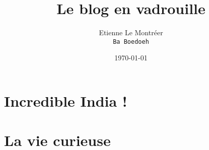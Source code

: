\documentclass[a5paper, 10pt]{book}
\begin{document}
\frontmatter
\title{Le blog en vadrouille}
\author{Etienne Le Montr\'eer\\
\texttt{Ba Boedoeh}}
\date{\today}

\maketitle

\begin{spacing}{1}
\tableofcontents

\mainmatter

%

\chapter{Incredible India !}

\pagebreak
\pagebreak
\pagebreak
\pagebreak
\pagebreak
\pagebreak
\pagebreak
\pagebreak
\pagebreak
\pagebreak
\pagebreak

\chapter{La vie curieuse}

\pagebreak
\pagebreak
\pagebreak
\pagebreak
\pagebreak
\pagebreak
\pagebreak
\pagebreak
\pagebreak
\pagebreak
\pagebreak
\pagebreak
\pagebreak


\end{spacing}
\end{document}
